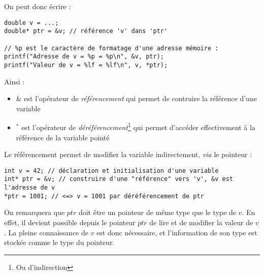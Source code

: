\documentclass[../../../main.tex]{subfiles}
\begin{document}
On peut donc écrire :
\begin{verbatim}
double v = ...;
double* ptr = &v; // référence 'v' dans 'ptr'

// %p est le caractère de formatage d'une adresse mémoire :
printf("Adresse de v = %p = %p\n", &v, ptr);
printf("Valeur de v = %lf = %lf\n", v, *ptr);
\end{verbatim}
Ainsi :
\begin{itemize}
	\item $\&$ est l'opérateur de \textit{référencement} qui permet de contruire la référence d'une variable
	\item $^*$ est l'opérateur de \textit{déréférencement}\footnote{Ou d'indirection} qui permet d'accéder effectivement à la référence de la variable pointé
\end{itemize}
Le référencement permet de modifier la variable indirectement, \textit{via} le pointeur :
\begin{verbatim}
int v = 42; // déclaration et initialisation d'une variable
int* ptr = &v; // construire d'une "référence" vers 'v', &v est l'adresse de v
*ptr = 1001; // <=> v = 1001 par déréférencement de ptr
\end{verbatim}
On remarquera que $ptr$ doit être un pointeur de même type que le type de $v$. En effet, il devient possible depuis le pointeur $ptr$ de lire et de modifier la valeur de $v$. La pleine connaissance de $v$ est donc nécessaire, et l'information de son type est stockée comme le type du pointeur.
\end{document}
